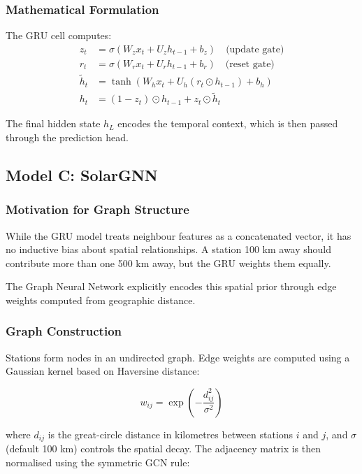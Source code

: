 \documentclass[11pt,a4paper]{article}
\begin{document}
\subsubsection{Mathematical Formulation}

The GRU cell computes:
\begin{align}
    z_t &= \sigma(W_z x_t + U_z h_{t-1} + b_z) \quad \text{(update gate)} \\
    r_t &= \sigma(W_r x_t + U_r h_{t-1} + b_r) \quad \text{(reset gate)} \\
    \tilde{h}_t &= \tanh(W_h x_t + U_h (r_t \odot h_{t-1}) + b_h) \\
    h_t &= (1 - z_t) \odot h_{t-1} + z_t \odot \tilde{h}_t
\end{align}

The final hidden state $h_L$ encodes the temporal context, which is then passed through the prediction head.

\subsection{Model C: SolarGNN}

\subsubsection{Motivation for Graph Structure}

While the GRU model treats neighbour features as a concatenated vector, it has no inductive bias about spatial relationships. A station 100 km away should contribute more than one 500 km away, but the GRU weights them equally.

The Graph Neural Network explicitly encodes this spatial prior through edge weights computed from geographic distance.

\subsubsection{Graph Construction}

Stations form nodes in an undirected graph. Edge weights are computed using a Gaussian kernel based on Haversine distance:

\begin{equation}
    w_{ij} = \exp\left(-\frac{d_{ij}^2}{\sigma^2}\right)
\end{equation}

where $d_{ij}$ is the great-circle distance in kilometres between stations $i$ and $j$, and $\sigma$ (default 100 km) controls the spatial decay. The adjacency matrix is then normalised using the symmetric GCN rule:
\end{document}
